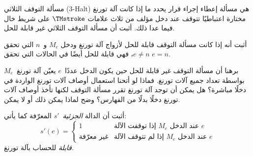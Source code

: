 \documentclass[../../../include/open-logic-section]{subfiles}
\begin{document}
\begin{prob}
مسألة التوقف الثلاثي (3-Halt) هي مسألة إعطاء إجراء قرار يحدد ما إذا
كانت آلة تورنغ مختارة اعتباطيًا تتوقف عند دخل مؤلف من ثلاث علامات
$\TMstroke$ على شريط خال فيما عدا ذلك. أثبت أن مسألة التوقف الثلاثي
غير قابلة للحل.
\end{prob}

\begin{prob}
أثبت أنه إذا كانت مسألة التوقف قابلة للحل لأزواج آلة تورنغ ودخل
$M_e$ و~$n$ التي تحقق $e\neq n$، فهي قابلة للحل أيضًا في الحالات التي
تحقق $e=n$.
\end{prob}

\begin{prob}
برهنا أن مسألة التوقف غير قابلة للحل حين يكون الدخل عددًا~$e$ يعيّن
آلة تورنغ~$M_e$ بواسطة تعداد جميع آلات تورنغ. فماذا لو أتحنا استعمال
أوصاف آلات تورنغ الواردة في  دخلًا مباشرة؟
هل يمكن أن توجد آلة تورنغ تقرر مسألة التوقف لكنها تأخذ أوصاف آلات
تورنغ دخلًا بدلًا من الفهارس؟ وضح لماذا يمكن ذلك أو لا يمكن.
\end{prob}

\begin{prob} أثبت أن الدالة \emph{الجزئية}~$s'$ المعرّفة كما يأتي:
  \[
  s'(e) =
  \begin{cases}
    \text{1} & \text{إذا توقفت الآلة~$M_e$ عند الدخل $e$}\\
    \text{غير معرّفة} & \text{إذا لم تتوقف الآلة~$M_e$ عند الدخل $e$}
  \end{cases}
  \]
  \emph{قابلة} للحساب بآلة تورنغ.
\end{prob}
\end{document}
